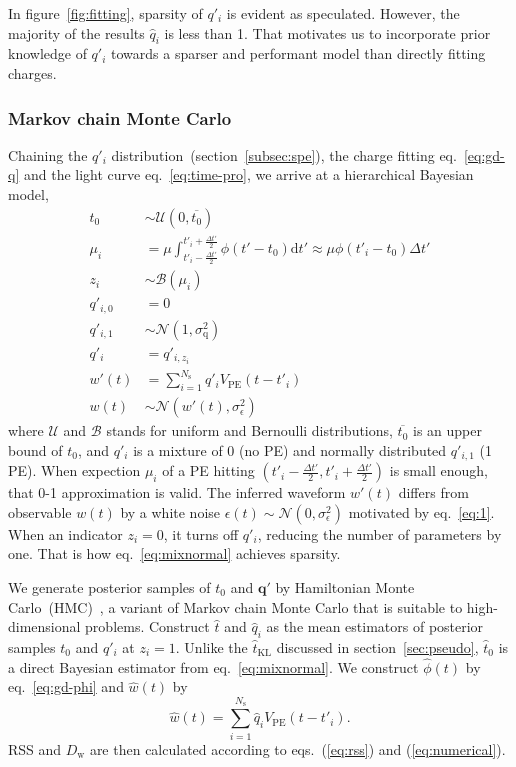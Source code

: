 In figure~\ref{fig:fitting}, sparsity of $q'_i$ is evident as speculated.  However, the majority of the results $\hat{q}_i$ is less than 1.  That motivates us to incorporate prior knowledge of $q'_i$ towards a sparser and performant model than directly fitting charges.


\subsubsection{Markov chain Monte Carlo}
\label{subsec:mcmc}
Chaining the $q'_i$ distribution~(section~\ref{subsec:spe}), the charge fitting eq.~\eqref{eq:gd-q} and the light curve eq.~\eqref{eq:time-pro}, we arrive at a hierarchical Bayesian model,
\begin{equation}
  \begin{aligned}
    t_{0} &\sim \mathcal{U}(0, \overline{t_0}) \\
    \mu_i &= \mu \int_{t'_i-\frac{\Delta t'}{2}}^{t'_i+\frac{\Delta t'}{2}} \phi(t' - t_0)\mathrm{d}t' \approx \mu\phi(t'_i - t_0)\Delta{t'} \\
    z_i &\sim \mathcal{B}(\mu_i) \\
    q'_{i,0}&=0\\
    q'_{i,1}& \sim \mathcal{N}(1, \sigma_\mathrm{q}^2)\\
    q'_i &= q'_{i,z_i}\\
    w'(t) & = \sum_{i=1}^{N_\mathrm{s}}q'_iV_\mathrm{PE}(t-t'_i)\\
    w(t) &\sim \mathcal{N}(w'(t), \sigma_\epsilon^2)
  \end{aligned}
  \label{eq:mixnormal}
\end{equation}
where $\mathcal{U}$ and $\mathcal{B}$ stands for uniform and Bernoulli distributions, $\overline{t_0}$ is an upper bound of $t_0$, and $q'_i$ is a mixture of 0 (no PE) and normally distributed $q'_{i,1}$ (1 PE). When expection $\mu_i$ of a PE hitting $(t'_{i} - \frac{\Delta t'}{2}, t'_{i} + \frac{\Delta t'}{2})$ is small enough, that 0-1 approximation is valid.  The inferred waveform $w'(t)$ differs from observable $w(t)$ by a white noise $\epsilon(t) \sim \mathcal{N}(0, \sigma_\epsilon^2)$ motivated by eq.~\eqref{eq:1}.  When an indicator $z_i=0$, it turns off $q'_i$, reducing the number of parameters by one.  That is how eq.~\eqref{eq:mixnormal} achieves sparsity.

We generate posterior samples of $t_0$ and $\bm{q'}$ by Hamiltonian Monte Carlo~(HMC)~\cite{neal_mcmc_2012}, a variant of Markov chain Monte Carlo that is suitable to high-dimensional problems. Construct $\hat{t}$ and $\hat{q}_i$ as the mean estimators of posterior samples $t_0$ and $q'_i$ at $z_i=1$.  Unlike the $\hat{t}_\mathrm{KL}$ discussed in section~\ref{sec:pseudo}, $\hat{t}_0$ is a direct Bayesian estimator from eq.~\eqref{eq:mixnormal}.  We construct $\hat{\phi}(t)$ by eq.~\eqref{eq:gd-phi} and $\hat{w}(t)$ by
\begin{equation}
  \label{eq:mcmc-w}
  \hat{w}(t) = \sum_{i=1}^{N_\mathrm{s}}\hat{q}_iV_\mathrm{PE}(t-t'_i).
\end{equation}
RSS and $D_\mathrm{w}$ are then calculated according to eqs.~(\ref{eq:rss}) and (\ref{eq:numerical}).

